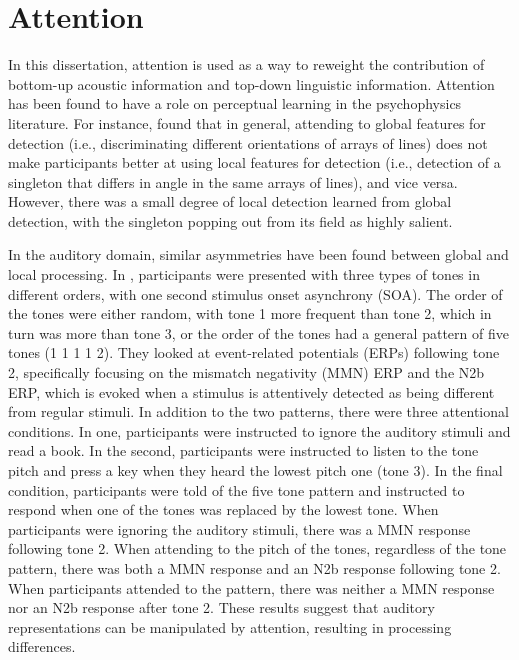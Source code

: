 \section{Attention}
\label{sec:attention}

In this dissertation, attention is used as a way to reweight the contribution of bottom-up acoustic information and top-down linguistic information.
Attention has been found to have a role on perceptual learning in the psychophysics literature.  
For instance, \citet{Ahissar1993} found that in general, attending to global features for detection (i.e., discriminating different orientations of arrays of lines) does not make participants better at using local features for detection (i.e., detection of a singleton that differs in angle in the same arrays of lines), and vice versa.  However, there was a small degree of local detection learned from global detection, with the singleton popping out from its field as highly salient.

In the auditory domain, similar asymmetries have been found between global and local processing.
In \citet{Sussman2002}, participants were presented with three types of tones in different orders, with one second stimulus onset asynchrony (SOA).  
The order of the tones were either random, with tone 1 more frequent than tone 2, which in turn was more than tone 3, or the order of the tones had a general pattern of five tones (1 1 1 1 2).  
They looked at event-related potentials (ERPs) following tone 2, specifically focusing on the mismatch negativity (MMN) ERP and the N2b ERP, which is evoked when a stimulus is attentively detected as being different from regular stimuli.
In addition to the two patterns, there were three attentional conditions.  
In one, participants were instructed to ignore the auditory stimuli and read a book.  
In the second, participants were instructed to listen to the tone pitch and press a key when they heard the lowest pitch one (tone 3). 
 In the final condition, participants were told of the five tone pattern and instructed to respond when one of the tones was replaced by the lowest tone.
When participants were ignoring the auditory stimuli, there was a MMN response following tone 2.  
When attending to the pitch of the tones, regardless of the tone pattern, there was both a MMN response and an N2b response following tone 2.  
When participants attended to the pattern, there was neither a MMN response nor an N2b response after tone 2.
These results suggest that auditory representations can be manipulated by attention, resulting in processing differences.

